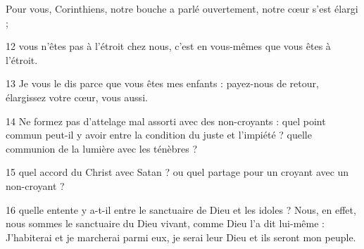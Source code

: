 Pour vous, Corinthiens, notre bouche a parlé ouvertement, notre cœur s’est élargi ;

12 vous n’êtes pas à l’étroit chez nous, c’est en vous-mêmes que vous êtes à l’étroit.

13 Je vous le dis parce que vous êtes mes enfants : payez-nous de retour, élargissez votre cœur, vous aussi.

14 Ne formez pas d’attelage mal assorti avec des non-croyants : quel point commun peut-il y avoir entre la condition du juste et l’impiété ? quelle communion de la lumière avec les ténèbres ?

15 quel accord du Christ avec Satan ? ou quel partage pour un croyant avec un non-croyant ?

16 quelle entente y a-t-il entre le sanctuaire de Dieu et les idoles ? Nous, en effet, nous sommes le sanctuaire du Dieu vivant, comme Dieu l’a dit lui-même : J’habiterai et je marcherai parmi eux, je serai leur Dieu et ils seront mon peuple.
